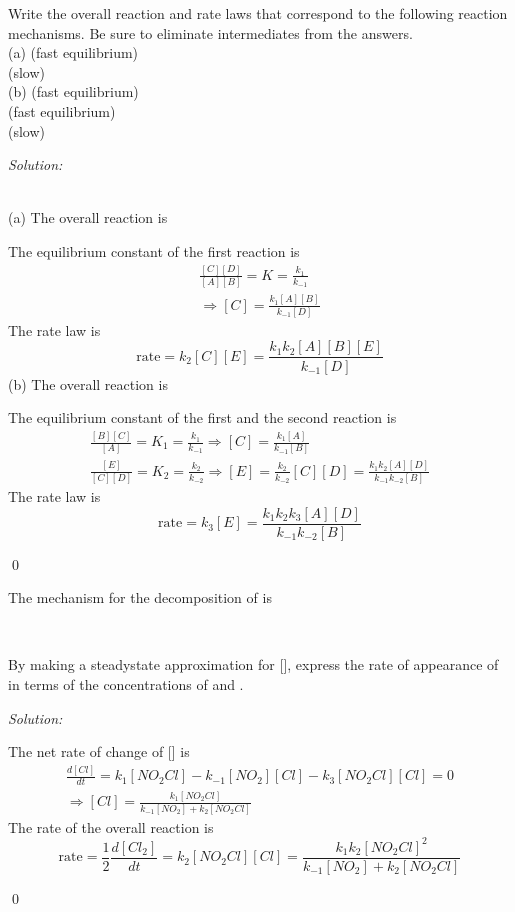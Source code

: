 \documentclass[12pt]{article}
\newenvironment{problem}[2][Problem]{\begin{trivlist}
\item[\hskip \labelsep {\bfseries #1}\hskip \labelsep {\bfseries #2.}]}{\end{trivlist}}
\newenvironment{sol}
    {\emph{Solution:}
    }
    {
    \qed
    }
\begin{document}
\begin{problem}{18.25}
Write the overall reaction and rate laws that correspond to the following reaction mechanisms. Be sure to eliminate intermediates from the answers.\\
(a) \hfill(fast equilibrium)\\
\indent{}\hfill(slow)\\
(b) \hfill(fast equilibrium)\\
\indent{}\hfill(fast equilibrium)\\
\indent{}\hfill(slow)
\end{problem}
\begin{sol}
\\(a) The overall reaction is
\begin{center}
\end{center}
The equilibrium constant of the first reaction is
\begin{gather*}
\frac{[C][D]}{[A][B]}=K=\frac{k_1}{k_{-1}}\\
\Longrightarrow[C]=\frac{k_1[A][B]}{k_{-1}[D]}
\end{gather*}
The rate law is
\[
\text{rate}=k_2[C][E]=\frac{k_1k_2[A][B][E]}{k_{-1}[D]}
\]
(b) The overall reaction is
\begin{center}
\end{center}
The equilibrium constant of the first and the second reaction is
\begin{gather*}
\frac{[B][C]}{[A]}=K_1=\frac{k_1}{k_{-1}}\Longrightarrow[C]=\frac{k_1[A]}{k_{-1}[B]}\\
\frac{[E]}{[C][D]}=K_2=\frac{k_2}{k_{-2}}\Longrightarrow[E]=\frac{k_2}{k_{-2}}[C][D]=\frac{k_1k_2[A][D]}{k_{-1}k_{-2}[B]}
\end{gather*}
The rate law is
\[
\text{rate}=k_3[E]=\frac{k_1k_2k_3[A][D]}{k_{-1}k_{-2}[B]}
\]
\end{sol}

\begin{problem}{18.33}
The mechanism for the decomposition of  is
\begin{center}
\\
\end{center}
By making a steady­state approximation for [], express the rate of appearance of  in terms of the concentrations of  and .
\end{problem}
\begin{sol}
The net rate of change of [] is
\begin{gather*}
\frac{d[Cl]}{dt}=k_1[NO_2Cl]-k_{-1}[NO_2][Cl]-k_3[NO_2Cl][Cl]=0\\
\Longrightarrow[Cl]=\frac{k_1[NO_2Cl]}{k_{-1}[NO_2]+k_2[NO_2Cl]}
\end{gather*}
The rate of the overall reaction  is
\[
\text{rate}=\frac{1}{2}\frac{d[Cl_2]}{dt}=k_2[NO_2Cl][Cl]=\frac{k_1k_2[NO_2Cl]^2}{k_{-1}[NO_2]+k_2[NO_2Cl]}
\]
\end{sol}
\end{document}
